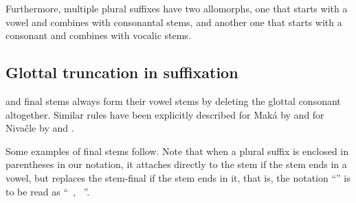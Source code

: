 \begin{table}
\caption{Consonantal and vocalic stems}
\label{pm-c-v-stems}
\end{table}

Furthermore, multiple plural suffixes have two allomorphs, one that starts with a vowel and combines with consonantal stems, and another one that starts with a consonant and combines with vocalic stems.

\begin{exe}
    \ex \plaj
    \ex \pll
    \ex \plits
\end{exe}

\subsection{Glottal truncation in suffixation}\label{glott-loss-suff}

 and final stems always form their vowel stems by deleting the glottal consonant altogether. Similar rules have been explicitly described for Maká by \citet[70–71]{AG89} and for Nivaĉle by \citet[271–272]{AnG15} and \citet[285]{AnG20}.

Some examples of final stems follow. Note that when a plural suffix is enclosed in parentheses in our notation, it attaches directly to the stem if the stem ends in a vowel, but replaces the stem-final  if the stem ends in it, that is, the notation ``'' is to be read as ``\SG~, \PL~''.


